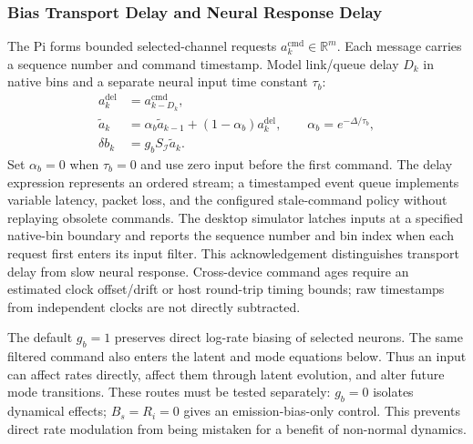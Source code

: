 \subsubsection{Bias Transport Delay and Neural Response Delay}
The Pi forms bounded selected-channel requests $a_k^{\mathrm{cmd}}\in\mathbb{R}^m$. Each message carries a sequence number and command timestamp. Model link/queue delay $D_k$ in native bins and a separate neural input time constant $\tau_b$:
\begin{align}
 a_k^{\mathrm{del}}&=a_{k-D_k}^{\mathrm{cmd}},\\
 \tilde a_k&=\alpha_b\tilde a_{k-1}+(1-\alpha_b)a_k^{\mathrm{del}},
 \qquad \alpha_b=e^{-\Delta/\tau_b},\\
 \delta b_k&=g_b S_{\mathcal I}\tilde a_k.
 \label{eq:bias-response}
\end{align}
Set $\alpha_b=0$ when $\tau_b=0$ and use zero input before the first command. The delay expression represents an ordered stream; a timestamped event queue implements variable latency, packet loss, and the configured stale-command policy without replaying obsolete commands. The desktop simulator latches inputs at a specified native-bin boundary and reports the sequence number and bin index when each request first enters its input filter. This acknowledgement distinguishes transport delay from slow neural response. Cross-device command ages require an estimated clock offset/drift or host round-trip timing bounds; raw timestamps from independent clocks are not directly subtracted.

The default $g_b=1$ preserves direct log-rate biasing of selected neurons. The same filtered command also enters the latent and mode equations below. Thus an input can affect rates directly, affect them through latent evolution, and alter future mode transitions. These routes must be tested separately: $g_b=0$ isolates dynamical effects; $B_s=R_i=0$ gives an emission-bias-only control. This prevents direct rate modulation from being mistaken for a benefit of non-normal dynamics.

